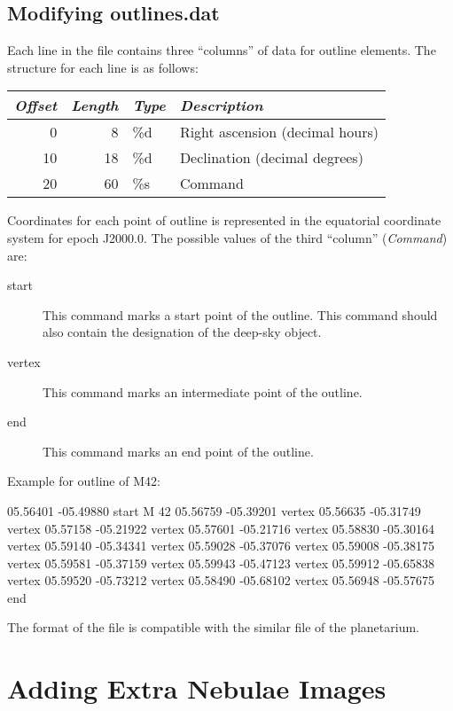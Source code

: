 \subsection{Modifying outlines.dat}
\label{sec:dso:modifyingOutlines}

\noindent{}Each line in the file  contains three ``columns'' of data for outline elements. The structure for each line is as follows:

\noindent%
\begin{tabularx}{\textwidth}{r|r|l|X}
\toprule
\emph{Offset} & \emph{Length} & \emph{Type} & \emph{Description}\\
\midrule
0  &  8 & \%d  & Right ascension (decimal hours)\\
10 & 18 & \%d  & Declination (decimal degrees)\\
20 & 60 & \%s  & Command\\
\bottomrule
\end{tabularx}

\noindent Coordinates for each point of outline is represented in the equatorial coordinate system for epoch J2000.0. 
The possible values of the third ``column'' (\emph{Command}) are:
\begin{description}
\item[start] This command marks a start point of the outline. This command should also contain the designation of the deep-sky object.
\item[vertex] This command marks an intermediate point of the outline.
\item[end] This command marks an end point of the outline.
\end{description}


Example for outline of M42:
\begin{configfile}
05.56401 -05.49880 start  M 42 
05.56759 -05.39201 vertex 
05.56635 -05.31749 vertex 
05.57158 -05.21922 vertex 
05.57601 -05.21716 vertex 
05.58830 -05.30164 vertex 
05.59140 -05.34341 vertex 
05.59028 -05.37076 vertex 
05.59008 -05.38175 vertex 
05.59581 -05.37159 vertex 
05.59943 -05.47123 vertex 
05.59912 -05.65838 vertex 
05.59520 -05.73212 vertex 
05.58490 -05.68102 vertex 
05.56948 -05.57675 end
\end{configfile}

The format of the file  is compatible with the similar file of the  planetarium.

\section{Adding Extra Nebulae Images}%
\label{sec:dso:adding_images}

